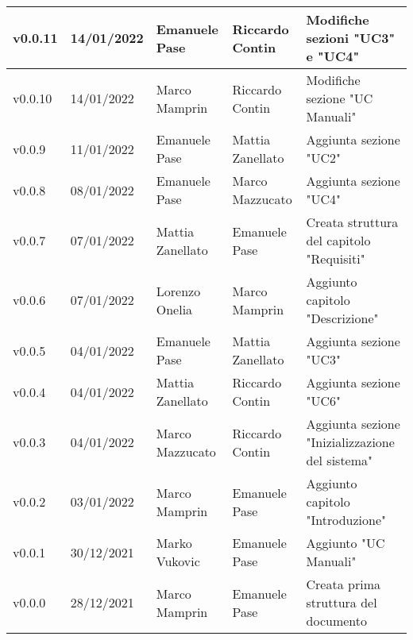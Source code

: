{\begin{longtable}{|C{1.8cm}|C{2.1cm}|C{2cm}|C{2.4cm}|L{4.4cm}|}
  v0.0.11           & 14/01/2022    & Emanuele Pase     & Riccardo Contin     & Modifiche sezioni "UC3" e "UC4"                 \\ \hline
  v0.0.10           & 14/01/2022    & Marco Mamprin     & Riccardo Contin     & Modifiche sezione "UC Manuali"                  \\ \hline
  v0.0.9            & 11/01/2022    & Emanuele Pase     & Mattia Zanellato    & Aggiunta sezione "UC2"                          \\ \hline
  v0.0.8            & 08/01/2022    & Emanuele Pase     & Marco Mazzucato     & Aggiunta sezione "UC4"                          \\ \hline
  v0.0.7            & 07/01/2022    & Mattia Zanellato  & Emanuele Pase       & Creata struttura del capitolo "Requisiti"       \\ \hline
  v0.0.6            & 07/01/2022    & Lorenzo Onelia    & Marco Mamprin       & Aggiunto capitolo "Descrizione"                 \\ \hline
  v0.0.5            & 04/01/2022    & Emanuele Pase     & Mattia Zanellato    & Aggiunta sezione "UC3"                          \\ \hline
  v0.0.4            & 04/01/2022    & Mattia Zanellato  & Riccardo Contin     & Aggiunta sezione "UC6"                          \\ \hline
  v0.0.3            & 04/01/2022    & Marco Mazzucato   & Riccardo Contin     & Aggiunta sezione "Inizializzazione del sistema" \\ \hline
  v0.0.2            & 03/01/2022    & Marco Mamprin     & Emanuele Pase       & Aggiunto capitolo "Introduzione"                \\ \hline
  v0.0.1            & 30/12/2021    & Marko Vukovic     & Emanuele Pase       & Aggiunto "UC Manuali"                            \\ \hline
  v0.0.0            & 28/12/2021    & Marco Mamprin     & Emanuele Pase       & Creata prima struttura del documento            \\ \hline
\end{longtable}}

\renewcommand\arraystretch{1}
